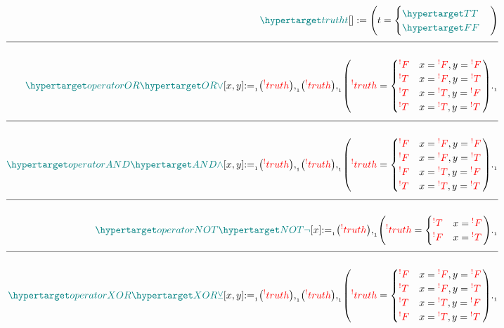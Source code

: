\documentclass[a4paper]{article}
\def\ml{\mleft}
\def\mr{\mright}
\newcommand{\defeq}{:=}
\newcommand{\eq}{=}
\newcommand{\cusand}{,}
\newcommand{\cusend}{.}
\newcommand{\cusnum}[2]{{#1}_{{\phantom{ }}_{#2}}}
\newcommand{\n}{\\[1.5ex] \hline \nonumber \\[0ex]}
\begin{document}
\begin{tcolorbox}
\begin{align}
     \dfn{truth} [t][] \defeq \ml(t \eq \begin{cases} \dfn{T} \\ \dfn{F} \end{cases}\mr) 
    \n \dfn{operatorOR} [\dfn{OR}[\lor]][x, y] \cusnum{\defeq}{1} \ml(\rfr{truth} [x][]\mr) \cusnum{\cusand}{1} \ml(\rfr{truth} [y][]\mr) \cusnum{\cusand}{1} \ml(\rfr{truth} [x \rfr{OR} y][] \eq \begin{cases} \rfr{F} & x \eq \rfr{F} \cusand y \eq \rfr{F} \\ \rfr{T} & x \eq \rfr{F} \cusand y \eq \rfr{T} \\ \rfr{T} & x \eq \rfr{T} \cusand y \eq \rfr{F} \\ \rfr{T} & x \eq \rfr{T} \cusand y \eq \rfr{T} \end{cases}\mr) \cusnum{\cusend}{1}
    \n \dfn{operatorAND} [\dfn{AND}[\land]][x, y] \cusnum{\defeq}{1} \ml(\rfr{truth} [x][]\mr) \cusnum{\cusand}{1} \ml(\rfr{truth} [y][]\mr) \cusnum{\cusand}{1} \ml(\rfr{truth} [x \rfr{AND} y][] \eq \begin{cases} \rfr{F} & x \eq \rfr{F} \cusand y \eq \rfr{F} \\ \rfr{F} & x \eq \rfr{F} \cusand y \eq \rfr{T} \\ \rfr{F} & x \eq \rfr{T} \cusand y \eq \rfr{F} \\ \rfr{T} & x \eq \rfr{T} \cusand y \eq \rfr{T} \end{cases}\mr) \cusnum{\cusend}{1}
    \n \dfn{operatorNOT} [\dfn{NOT}[\lnot]][x] \cusnum{\defeq}{1} \ml(\rfr{truth} [x][]\mr) \cusnum{\cusand}{1} \ml(\rfr{truth} [\rfr{NOT} x][] \eq \begin{cases} \rfr{T} & x \eq \rfr{F} \\ \rfr{F} & x \eq \rfr{T} \end{cases}\mr) \cusnum{\cusend}{1} 
    \n \dfn{operatorXOR} [\dfn{XOR}[\veebar]][x, y] \cusnum{\defeq}{1} \ml(\rfr{truth} [x][]\mr) \cusnum{\cusand}{1} \ml(\rfr{truth} [y][]\mr) \cusnum{\cusand}{1} \ml(\rfr{truth} [x \rfr{XOR} y][] \eq \begin{cases} \rfr{F} & x \eq \rfr{F} \cusand y \eq \rfr{F} \\ \rfr{T} & x \eq \rfr{F} \cusand y \eq \rfr{T} \\ \rfr{T} & x \eq \rfr{T} \cusand y \eq \rfr{F} \\ \rfr{F} & x \eq \rfr{T} \cusand y \eq \rfr{T} \end{cases}\mr) \cusnum{\cusend}{1}

\end{align}
\end{tcolorbox}
\end{document}
